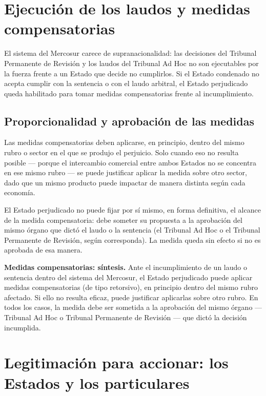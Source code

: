 \documentclass[12pt,oneside]{book}
\begin{document}
\section{Ejecución de los laudos y medidas compensatorias}

El sistema del Mercosur carece de supranacionalidad: las decisiones del Tribunal Permanente de Revisión y los laudos del Tribunal Ad Hoc no son ejecutables por la fuerza frente a un Estado que decide no cumplirlos. Si el Estado condenado no acepta cumplir con la sentencia o con el laudo arbitral, el Estado perjudicado queda habilitado para tomar medidas compensatorias frente al incumplimiento.

\subsection{Proporcionalidad y aprobación de las medidas}

Las medidas compensatorias deben aplicarse, en principio, dentro del mismo rubro o sector en el que se produjo el perjuicio. Solo cuando eso no resulta posible --- porque el intercambio comercial entre ambos Estados no se concentra en ese mismo rubro --- se puede justificar aplicar la medida sobre otro sector, dado que un mismo producto puede impactar de manera distinta según cada economía.

El Estado perjudicado no puede fijar por sí mismo, en forma definitiva, el alcance de la medida compensatoria: debe someter su propuesta a la aprobación del mismo órgano que dictó el laudo o la sentencia (el Tribunal Ad Hoc o el Tribunal Permanente de Revisión, según corresponda). La medida queda sin efecto si no es aprobada de esa manera.

\begin{important}
\textbf{Medidas compensatorias: síntesis.} Ante el incumplimiento de un laudo o sentencia dentro del sistema del Mercosur, el Estado perjudicado puede aplicar medidas compensatorias (de tipo retorsivo), en principio dentro del mismo rubro afectado. Si ello no resulta eficaz, puede justificar aplicarlas sobre otro rubro. En todos los casos, la medida debe ser sometida a la aprobación del mismo órgano --- Tribunal Ad Hoc o Tribunal Permanente de Revisión --- que dictó la decisión incumplida.
\end{important}

\section{Legitimación para accionar: los Estados y los particulares}
\end{document}
